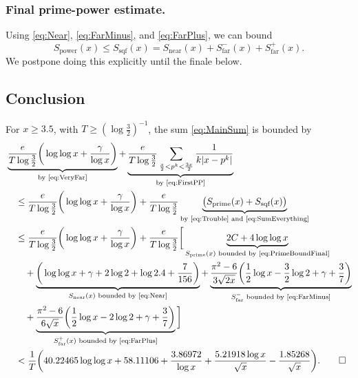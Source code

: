 \documentclass[10pt,reqno]{amsart}
\theoremstyle{plain}
\theoremstyle{definition}
\begin{document}
\subsubsection{Final prime-power estimate.}

Using \eqref{eq:Near}, \eqref{eq:FarMinus}, and \eqref{eq:FarPlus}, we can bound
\begin{equation*}
    S_{\mathrm{power}}(x)
    \leq S_{\mathrm{sqf}} (x)  = S_{\mathrm{near}}(x) + S_{\mathrm{far}}^-(x)  + S_{\mathrm{far}}^+(x) .
\end{equation*}
We postpone doing this explicitly until the finale below.

\subsection{Conclusion}\label{Subsection:Conclusion}
For $x \geq 3.5$, with $T \geq (\log \frac{3}{2})^{-1}$, the sum \eqref{eq:MainSum} is bounded by
\begin{align*}
    &\underbrace{\frac{e}{T \log \frac{3}{2}}\bigg(\log \log x + \frac{\gamma}{\log x} \bigg)}_{\text{by \eqref{eq:VeryFar}}}
    + \underbrace{\frac{e }{T \log\frac{3}{2}} \sum_{\frac{x}{2} < p^k < \frac{3x}{2}}  \frac{1}{k |  x-p^k |} }_{\text{by \eqref{eq:FirstPP}}} \\
    &\quad \leq \frac{e}{T \log \frac{3}{2}} \bigg(\log \log x + \frac{\gamma}{\log x} \bigg)
    + \frac{e}{T \log \frac{3}{2}} \underbrace{ \big(S_{\text{prime}}(x) + S_{\text{sqf}}(x) \big)}_{\text{by \eqref{eq:Trouble} and \eqref{eq:SumEverything}}} \\
    &\quad \leq \frac{e}{T \log \frac{3}{2}} \bigg(\log \log x + \frac{\gamma}{\log x} \bigg)
    + \frac{e}{T \log \frac{3}{2}}\bigg[ \underbrace{2C +4 \log\log x}_{\text{$S_{\text{prime}}(x)$ bounded by \eqref{eq:PrimeBoundFinal}}} \\
    &\qquad + 
    \underbrace{ \bigg(\log \log x  + \gamma + 2\log 2 + \log 2.4 +\frac{7}{156}  \bigg) }_{\text{$S_{\text{near}}(x)$ bounded by \eqref{eq:Near}}} 
    + \underbrace{\frac{\pi^2-6}{3\sqrt{2 x}}  \bigg(\frac{1}{2}\log{x} - \frac{3}{2}\log{2} + \gamma + \frac{3}{7} \bigg)}_{\text{$S_{\text{far}}^-$ bounded by \eqref{eq:FarMinus}}} \\
    &\qquad + \underbrace{\frac{\pi^2-6}{6\sqrt{x}}  \bigg(\frac{1}{2}\log{x} - 2\log{2} + \gamma + \frac{3}{7} \bigg)}_{\text{$S_{\text{far}}^+(x)$ bounded by \eqref{eq:FarPlus}}}
     \bigg] \\
    &\quad 
    < \frac{1}{T}\bigg(
    40.22465 \log \log x
    +58.11106
    +\frac{3.86972}{\log x}
    +\frac{5.21918 \log x}{\sqrt{x}}
    -\frac{1.85268}{\sqrt{x}}
    \bigg). \qed
\end{align*}




\end{document}
